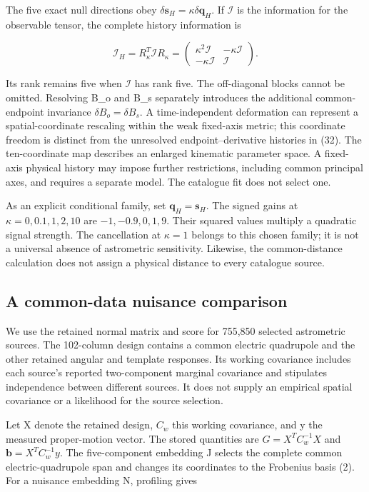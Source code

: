 \documentclass[aps,prd,preprint,onecolumn,notitlepage]{revtex4-2}
\begin{document}
The five exact null directions obey \(\delta\boldsymbol s_H=\kappa\delta\boldsymbol q_H\). If \(\mathcal I\) is the information for the observable tensor, the complete history information is

\[
\mathcal I_H=R_\kappa^T\mathcal I R_\kappa
=\begin{pmatrix}\kappa^2\mathcal I&-\kappa\mathcal I\\
-\kappa\mathcal I&\mathcal I\end{pmatrix}.
\tag{33}
\]

Its rank remains five when \(\mathcal I\) has rank five. The off-diagonal blocks cannot be omitted. Resolving B\_o and B\_s separately introduces the additional common-endpoint invariance \(\delta B_o=\delta B_s\). A time-independent deformation can represent a spatial-coordinate rescaling within the weak fixed-axis metric; this coordinate freedom is distinct from the unresolved endpoint--derivative histories in (32). The ten-coordinate map describes an enlarged kinematic parameter space. A fixed-axis physical history may impose further restrictions, including common principal axes, and requires a separate model. The catalogue fit does not select one.

As an explicit conditional family, set \(\boldsymbol q_H=\boldsymbol s_H\). The signed gains at \(\kappa=0,0.1,1,2,10\) are \(-1,-0.9,0,1,9\). Their squared values multiply a quadratic signal strength. The cancellation at \(\kappa=1\) belongs to this chosen family; it is not a universal absence of astrometric sensitivity. Likewise, the common-distance calculation does not assign a physical distance to every catalogue source.

\hypertarget{a-common-data-nuisance-comparison}{%
\subsection{A common-data nuisance comparison}\label{a-common-data-nuisance-comparison}}

We use the retained normal matrix and score for 755,850 selected astrometric sources. The 102-column design contains a common electric quadrupole and the other retained angular and template responses. Its working covariance includes each source's reported two-component marginal covariance and stipulates independence between different sources. It does not supply an empirical spatial covariance or a likelihood for the source selection.

Let X denote the retained design, \(C_w\) this working covariance, and y the measured proper-motion vector. The stored quantities are \(G=X^TC_w^{-1}X\) and \(\boldsymbol b=X^TC_w^{-1}y\). The five-component embedding J selects the complete common electric-quadrupole span and changes its coordinates to the Frobenius basis (2). For a nuisance embedding N, profiling gives
\end{document}
